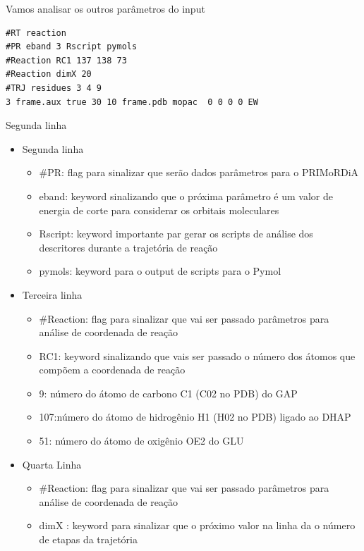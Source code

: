 \documentclass[a4paper,11pt]{refart}
\begin{document}
	Vamos analisar os outros parâmetros do input
	 
	 \hspace*{-\leftmarginwidth}
\begin{minipage}{\fullwidth}
\begin{lstlisting}[caption={Input editado para execução do tutorial 3},label={tut402}]
#RT reaction 
#PR eband 3 Rscript pymols
#Reaction RC1 137 138 73
#Reaction dimX 20
#TRJ residues 3 4 9
3 frame.aux true 30 10 frame.pdb mopac  0 0 0 0 EW
\end{lstlisting}
\end{minipage}
	 
	 Segunda linha
	 \begin{itemize}
	 	\item Segunda linha
	 	\begin{itemize}
	 		\item \#PR:    flag para sinalizar que serão dados parâmetros para o PRIMoRDiA
	 		\item eband:   keyword sinalizando que o próxima parâmetro é um valor de energia de corte para considerar os orbitais moleculares
	 		\item Rscript: keyword importante par gerar os scripts de análise dos descritores durante a trajetória de reação
	 		\item pymols:  keyword para o output de scripts para o Pymol
	 	\end{itemize}
	 	\item Terceira linha
	 	\begin{itemize}
	 		\item \#Reaction: flag para sinalizar que vai ser passado parâmetros para análise de coordenada de reação
	 		\item RC1: keyword sinalizando que vais ser passado o número dos átomos que compõem a coordenada de reação
	 		\item 9:  número do átomo de carbono C1 (C02 no PDB) do GAP 
	 		\item 107:número do átomo de hidrogênio H1 (H02 no PDB) ligado ao DHAP
	 		\item 51: número do átomo de oxigênio OE2 do GLU
	 	\end{itemize}
	 	\item Quarta Linha
	 	\begin{itemize}
	 		\item \#Reaction: flag para sinalizar que vai ser passado parâmetros para análise de coordenada de reação
	 		\item dimX      : keyword para sinalizar que o próximo valor na linha da o número de etapas da trajetória

\end{itemize}
\end{itemize}
\end{document}

